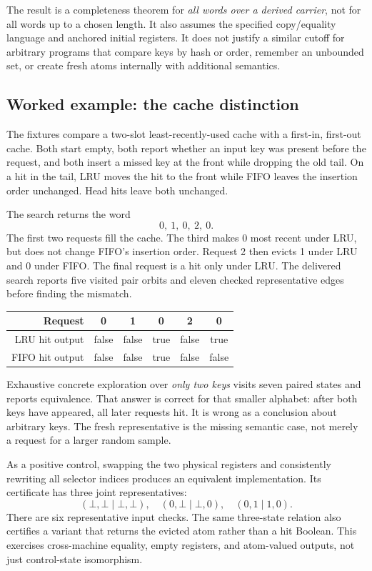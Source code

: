 The result is a completeness theorem for \emph{all words over a derived
carrier}, not for all words up to a chosen length. It also assumes the specified
copy/equality language and anchored initial registers. It does not justify a
similar cutoff for arbitrary programs that compare keys by hash or order,
remember an unbounded set, or create fresh atoms internally with additional
semantics.

\subsection{Worked example: the cache distinction}
The fixtures compare a two-slot least-recently-used cache with a first-in,
first-out cache. Both start empty, both report whether an input key was present
before the request, and both insert a missed key at the front while dropping
the old tail. On a hit in the tail, LRU moves the hit to the front while FIFO
leaves the insertion order unchanged. Head hits leave both unchanged.

The search returns the word
\[
 0,\ 1,\ 0,\ 2,\ 0.
\]
The first two requests fill the cache. The third makes 0 most recent under LRU,
but does not change FIFO's insertion order. Request 2 then evicts 1 under LRU
and 0 under FIFO. The final request is a hit only under LRU. The delivered
search reports five visited pair orbits and eleven checked representative
edges before finding the mismatch.

\begin{center}
\begin{tabular}{@{}rccccc@{}}
\toprule
Request & 0 & 1 & 0 & 2 & 0 \\
\midrule
LRU hit output & false & false & true & false & true \\
FIFO hit output & false & false & true & false & false \\
\bottomrule
\end{tabular}
\end{center}

Exhaustive concrete exploration over \emph{only two keys} visits seven paired
states and reports equivalence. That answer is correct for that smaller
alphabet: after both keys have appeared, all later requests hit. It is wrong
as a conclusion about arbitrary keys. The fresh representative is the missing
semantic case, not merely a request for a larger random sample.

As a positive control, swapping the two physical registers and consistently
rewriting all selector indices produces an equivalent implementation. Its
certificate has three joint representatives:
\[
 (\bot,\bot\mid\bot,\bot),\quad
 (0,\bot\mid\bot,0),\quad
 (0,1\mid1,0).
\]
There are six representative input checks. The same three-state relation also
certifies a variant that returns the evicted atom rather than a hit Boolean.
This exercises cross-machine equality, empty registers, and atom-valued
outputs, not just control-state isomorphism.

